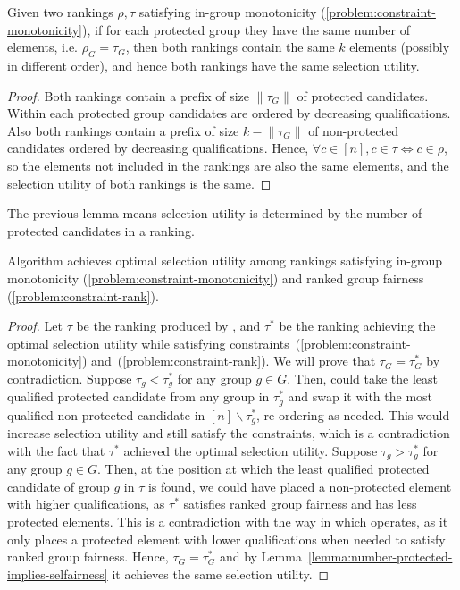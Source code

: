 \begin{lemma}\label{lemma:number-protected-implies-selfairness} %
	Given two rankings $\rho, \tau$ satisfying in-group monotonicity (\ref{problem:constraint-monotonicity}), if for each protected group they have the same number of elements, i.e. $\rho_G = \tau_G$, then both rankings contain the same $k$ elements (possibly in different order), and hence both rankings have the same selection utility.
\end{lemma}

\begin{proof}
	Both rankings contain a prefix of size $\lVert\tau_G\rVert$ of protected candidates. 
	Within each protected group candidates are ordered by decreasing qualifications.
	Also both rankings contain a prefix of size $k - \lVert\tau_G\rVert$ of non-protected candidates ordered by decreasing qualifications. 
	Hence, $\forall c \in [n], c \in \tau \Leftrightarrow c \in \rho$, so the elements not included in the rankings are also the same elements, and the selection utility of both rankings is the same.
\end{proof}

The previous lemma means selection utility is determined by the number of protected candidates in a ranking.

\begin{lemma}\label{lemma:fair-optimal-selection}
	Algorithm \algoFAIR achieves optimal selection utility among rankings satisfying in-group monotonicity (\ref{problem:constraint-monotonicity}) and ranked group fairness (\ref{problem:constraint-rank}).
\end{lemma}

\begin{proof}
	Let $\tau$ be the ranking produced by \algoFAIR, and $\tau^*$ be the ranking achieving the optimal selection utility while satisfying constraints~(\ref{problem:constraint-monotonicity}) and~(\ref{problem:constraint-rank}). We will prove that $\tau_G = \tau^*_G$ by contradiction.
	Suppose $\tau_g < \tau^*_g$ for any group $g \in G$. 
	Then, \algoFAIR could take the least qualified protected candidate from any group in $\tau^*_g$ and swap it with the most qualified non-protected candidate in $[n] \backslash \tau^*_g$, re-ordering as needed. 
	This would increase selection utility and still satisfy the constraints, which is a contradiction with the fact that $\tau^* $ achieved the optimal selection utility.
	Suppose $\tau_g > \tau^*_g$ for any group $g \in G$. Then, at the position at which the least qualified protected candidate of group $g$ in $\tau$ is found, we could have placed a non-protected element with higher qualifications, as $\tau^*$ satisfies ranked group fairness and has less protected elements. This is a contradiction with the way in which \algoFAIR operates, as it only places a protected element with lower qualifications when needed to satisfy ranked group fairness.
	Hence, $\tau_G = \tau^*_G$ and by Lemma~\ref{lemma:number-protected-implies-selfairness} it achieves the same selection utility.
\end{proof}

